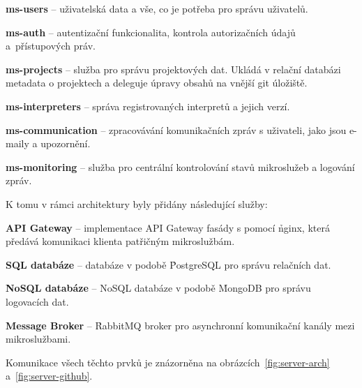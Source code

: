 \begin{ul}
   \item \textbf{ms-users} – uživatelská data a vše, co je potřeba pro správu uživatelů.
   \item \textbf{ms-auth} – autentizační funkcionalita, kontrola autorizačních údajů a~přístupových práv.
   \item \textbf{ms-projects} – služba pro správu projektových dat.
   Ukládá v relační databázi metadata o projektech a deleguje úpravy obsahů na vnější git úložiště.
   \item \textbf{ms-interpreters} – správa registrovaných interpretů a jejich verzí.
   \item \textbf{ms-communication} – zpracovávání komunikačních zpráv s uživateli, jako jsou e-maily a upozornění.
   \item \textbf{ms-monitoring} – služba pro centrální kontrolování stavů mikroslužeb a logování zpráv.
\end{ul}

K tomu v rámci architektury byly přidány následující služby:

\begin{ul}
   \item \textbf{API Gateway} – implementace API Gateway fasády s pomocí \h{nginx}, která předává komunikaci klienta patřičným mikroslužbám.
   \item \textbf{SQL databáze} –  databáze v podobě \h{PostgreSQL} pro správu relačních dat.
   \item \textbf{NoSQL databáze} – NoSQL databáze v podobě \h{MongoDB} pro správu logovacích dat.
   \item \textbf{Message Broker} – \h{RabbitMQ} broker pro asynchronní komunikační kanály mezi mikroslužbami.
\end{ul}

Komunikace všech těchto prvků je znázorněna na obrázcích~\ref{fig:server-arch} a~\ref{fig:server-github}.

